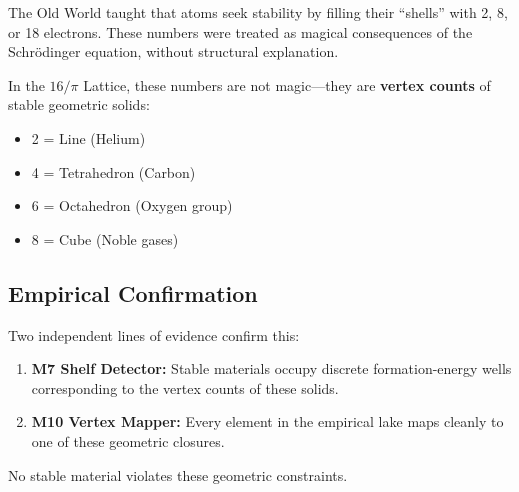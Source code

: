 \documentclass[11pt, letterpaper, openany]{book}
\begin{document}
The Old World taught that atoms seek stability by filling their “shells” with 2, 8, or 18
electrons. These numbers were treated as magical consequences of the Schrödinger
equation, without structural explanation.

In the $16/\pi$ Lattice, these numbers are not magic—they are \textbf{vertex counts} of stable
geometric solids:

\begin{itemize}
    \item 2 = Line (Helium)
    \item 4 = Tetrahedron (Carbon)
    \item 6 = Octahedron (Oxygen group)
    \item 8 = Cube (Noble gases)
\end{itemize}

\subsection*{Empirical Confirmation}

Two independent lines of evidence confirm this:

\begin{enumerate}
    \item \textbf{M7 Shelf Detector:} Stable materials occupy discrete formation-energy wells
    corresponding to the vertex counts of these solids.
    \item \textbf{M10 Vertex Mapper:} Every element in the empirical lake maps cleanly to one of
    these geometric closures.
\end{enumerate}

No stable material violates these geometric constraints.
\end{document}
